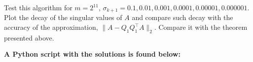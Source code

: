 \documentclass[11pt]{article}
\begin{document}
Test this algorithm for $m = 2^{11}$, $\sigma_{k+1} = 0.1, 0.01, 0.001, 0.0001, 0.00001, 0.000001$. Plot the decay of the singular values of $A$ and compare such decay with the accuracy of the approximation,  $ \| A - Q_1Q_1^{\top}A\|_2$. Compare it with the theorem presented above.

\textbf{A Python script with the solutions is found below:}





\end{document}
